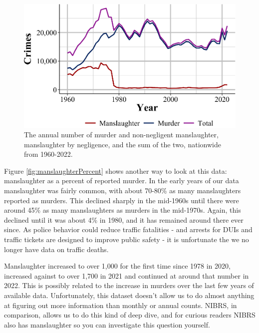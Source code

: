 \documentclass[
  12pt,
  openany]{book}
\begin{document}
\begin{figure}

{\centering \includegraphics[width=0.9\linewidth]{03_offenses_known_files/figure-latex/manslaughterVsMurder-1} 

}

\caption{The annual number of murder and non-negligent manslaughter, manslaughter by negligence, and the sum of the two, nationwide from 1960-2022.}\label{fig:manslaughterVsMurder}
\end{figure}

Figure \ref{fig:manslaughterPercent} shows another way to look at this data: manslaughter as a percent of reported murder. In the early years of our data manslaughter was fairly common, with about 70-80\% as many manslaughters reported as murders. This declined sharply in the mid-1960s until there were around 45\% as many manslaughters as murders in the mid-1970s. Again, this declined until it was about 4\% in 1980, and it has remained around there ever since. As police behavior could reduce traffic fatalities - and arrests for DUIs and traffic tickets are designed to improve public safety - it is unfortunate the we no longer have data on traffic deaths.

Manslaughter increased to over 1,000 for the first time since 1978 in 2020, increased against to over 1,700 in 2021 and continued at around that number in 2022. This is possibly related to the increase in murders over the last few years of available data. Unfortunately, this dataset doesn't allow us to do almost anything at figuring out more information than monthly or annual counts. NIBRS, in comparison, allows us to do this kind of deep dive, and for curious readers NIBRS also has manslaughter so you can investigate this question yourself.
\end{document}
